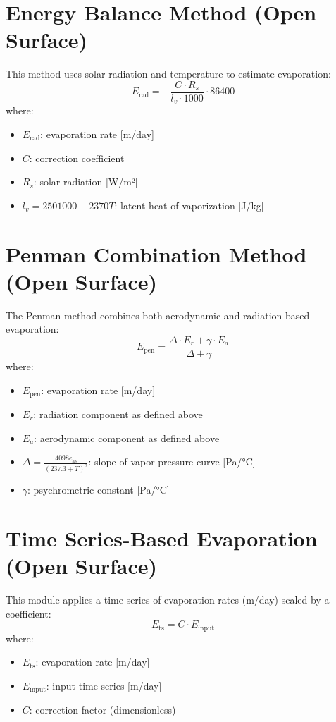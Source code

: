 \documentclass[12pt]{report}
\begin{document}
\section{Energy Balance Method (Open Surface)}

This method uses solar radiation and temperature to estimate evaporation:
\begin{equation}
E_{\text{rad}} = -\frac{C \cdot R_s}{l_v \cdot 1000} \cdot 86400
\end{equation}
where:
\begin{itemize}
\item $E_{\text{rad}}$: evaporation rate [m/day]
\item $C$: correction coefficient
\item $R_s$: solar radiation [W/m²]
\item $l_v = 2501000 - 2370 T$: latent heat of vaporization [J/kg]
\end{itemize}

\section{Penman Combination Method (Open Surface)}

The Penman method combines both aerodynamic and radiation-based evaporation:
\begin{equation}
E_{\text{pen}} = \frac{\Delta \cdot E_r + \gamma \cdot E_a}{\Delta + \gamma}
\end{equation}
where:
\begin{itemize}
\item $E_{\text{pen}}$: evaporation rate [m/day]
\item $E_r$: radiation component as defined above
\item $E_a$: aerodynamic component as defined above
\item $\Delta = \frac{4098 e_{\text{as}}}{(237.3 + T)^2}$: slope of vapor pressure curve [Pa/°C]
\item $\gamma$: psychrometric constant [Pa/°C]
\end{itemize}

\section{Time Series-Based Evaporation (Open Surface)}

This module applies a time series of evaporation rates (m/day) scaled by a coefficient:
\begin{equation}
E_{\text{ts}} = C \cdot E_{\text{input}}
\end{equation}
where:
\begin{itemize}
\item $E_{\text{ts}}$: evaporation rate [m/day]
\item $E_{\text{input}}$: input time series [m/day]
\item $C$: correction factor (dimensionless)
\end{itemize}
\end{document}
